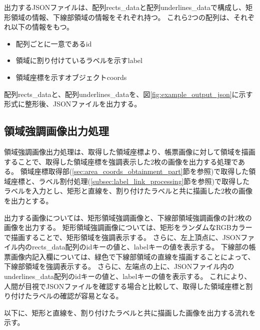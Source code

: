出力するJSONファイルは、配列rects\_dataと配列underlines\_dataで構成し、矩形領域の情報、下線部領域の情報をそれぞれ持つ。
これら2つの配列は、それぞれ以下の情報をもつ。

\begin{itemize}
    \item 配列ごとに一意であるid
    \item 領域に割り付けているラベルを示すlabel
    \item 領域座標を示すオブジェクトcoords
\end{itemize}

配列rects\_dataと、配列underlines\_dataを、図\ref{fig:example_output_json}に示す形式に整形後、JSONファイルを出力する。

\subsection{領域強調画像出力処理}\label{subsec:area_highlighted_image_output_processing}
領域強調画像出力処理は、取得した領域座標より、帳票画像に対して領域を描画することで、取得した領域座標を強調表示した2枚の画像を出力する処理である。
領域座標取得部(\ref{sec:area_coords_obtainment_part}節を参照)で取得した領域座標と、ラベル割付処理(\ref{subsec:label_link_processing}節を参照)で取得したラベルを入力とし、矩形と直線を、割り付けたラベルと共に描画した2枚の画像を出力とする。

出力する画像については、矩形領域強調画像と、下線部領域強調画像の計2枚の画像を出力する。
矩形領域強調画像については、矩形をランダムなRGBカラーで描画することで、矩形領域を強調表示する。
さらに、左上頂点に、JSONファイル内のrects\_data配列のidキーの値と、labelキーの値を表示する。
下線部の帳票画像内記入欄については、緑色で下線部領域の直線を描画することによって、下線部領域を強調表示する。
さらに、左端点の上に、JSONファイル内のunderlines\_data配列のidキーの値と、labelキーの値を表示する。
これにより、人間が目視でJSONファイルを確認する場合と比較して、取得した領域座標と割り付けたラベルの確認が容易となる。

以下に、矩形と直線を、割り付けたラベルと共に描画した画像を出力する流れを示す。

